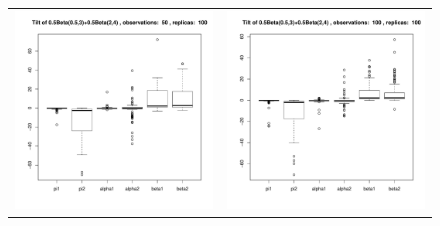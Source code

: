 \documentclass[10pt]{report}
\begin{document}
\begin{figure}[h]
\begin{tabular}{cc}
\includegraphics[width=\textwidth/2]{../img/p05_a05_b3_p05_a2_b4/tilted/K2/bxplots/n50_R100.pdf}
&
\includegraphics[width=\textwidth/2]{../img/p05_a05_b3_p05_a2_b4/tilted/K2/bxplots/n100_R100.pdf}\\


\end{tabular}
\end{figure}
\end{document}
